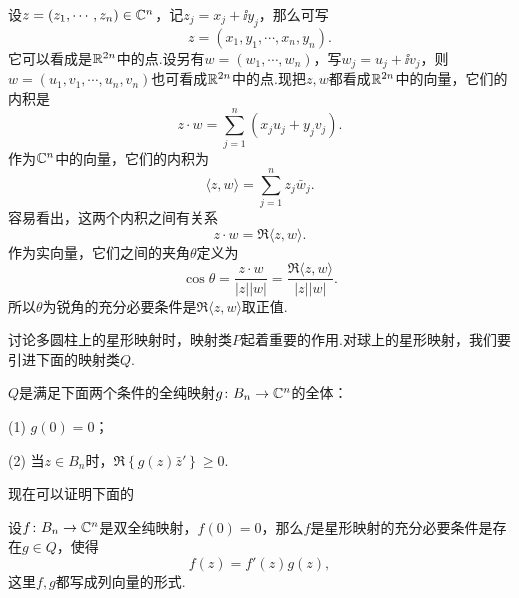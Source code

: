 设$z=(z_1,\cdots,z_n)\in\mathbb C^n$，记$z_j=x_j+\ii y_j$，那么可写
\[z=(x_1,y_1,\cdots,x_n,y_n).\]
它可以看成是$\mathbb R^{2n}$中的点.设另有$w=(w_1,\cdots,w_n)$，写$w_j=u_j+\ii v_j$，则$w=(u_1,v_1,\cdots,u_n,v_n)$也可看成$\mathbb R^{2n}$中的点.现把$z,w$都看成$\mathbb R^{2n}$中的向量，它们的内积是
\[z\cdot w=\sum_{j=1}^{n}(x_ju_j+y_jv_j).\]
作为$\mathbb C^n$中的向量，它们的内积为
\[\langle z,w\rangle=\sum_{j=1}^{n}z_j\bar{w}_j.\]
容易看出，这两个内积之间有关系
\[z\cdot w=\Re\langle z,w\rangle.\]
作为实向量，它们之间的夹角$\theta$定义为
\[\cos\theta=\frac{z\cdot w}{|z||w|}=\frac{\Re\langle z,w\rangle}{|z||w|}.\]
所以$\theta$为锐角的充分必要条件是$\Re\langle z,w\rangle$取正值.

讨论多圆柱上的星形映射时，映射类$P$起着重要的作用.对球上的星形映射，我们要引进下面的映射类$Q$.
\begin{definition}\label{def2.5.11}
	$Q$是满足下面两个条件的全纯映射$g\colon B_n\to\mathbb C^n$的全体：
	
	(1)\hypertarget{2.5.11}{}
	$g(0)=0$；
	
	(2)\hypertarget{2.5.11}{}
	当$z\in B_n$时，$\Re \left\{g(z)\bar{z}'\right\}\ge0$.
\end{definition}
现在可以证明下面的
\begin{theorem}\label{thm2.5.12}
	设$f\colon B_n\to\mathbb C^n$是双全纯映射，$f(0)=0$，那么$f$是星形映射的充分必要条件是存在$g\in Q$，使得
	\begin{equation}\label{eq2.5.15}
		f(z)=f'(z)g(z),
	\end{equation}
这里$f,g$都写成列向量的形式.
\end{theorem}
